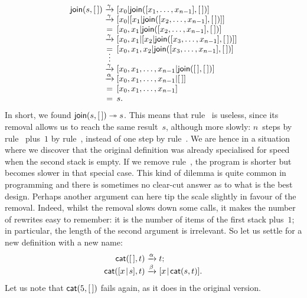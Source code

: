 \begin{equation*}
\begin{array}{r@{\;}c@{\;}l}
\fun{join}(s,\el)
& \smashedrightarrow{\gamma} &
  [x\sb{0}|\fun{join}([x\sb{1},\ldots,x\sb{n-1}],\el)]\\
& \smashedrightarrow{\gamma} &
  [x\sb{0}|[x\sb{1}|\fun{join}([x\sb{2},\ldots,x\sb{n-1}],\el)]]\\
& = & [x\sb{0},x\sb{1}|\fun{join}([x\sb{2},\ldots,x\sb{n-1}],\el)]\\
& \smashedrightarrow{\gamma} &
  [x\sb{0},x\sb{1}|[x\sb{2}|\fun{join}([x\sb{3},\ldots,x\sb{n-1}],\el)]]\\
& = & [x\sb{0},x\sb{1},x\sb{2}|\fun{join}([x\sb{3},\ldots,x\sb{n-1}],\el)]\\
& \smash{\vdots} &\\
& \smashedrightarrow{\gamma} &
  [x\sb{0},x\sb{1},\ldots,x\sb{n-1}|\fun{join}(\el,\el)]\\
& \smashedrightarrow{\alpha} & [x\sb{0},x\sb{1},\ldots,x\sb{n-1}|\el]\\
& = & [x\sb{0},x\sb{1},\ldots,x\sb{n-1}]\\
& = & s.
\end{array}
\end{equation*}
In short, we found \(\textsf{join}(s,[\,]) \twoheadrightarrow s\).
This means that rule~\clause{\beta} is useless, since its removal
allows us to reach the same result~\(s\), although more slowly:
\(n\)~steps by rule~\clause{\gamma} plus~\(1\) by
rule~\clause{\alpha}, instead of one step by
rule~\clause{\beta}. We are hence in a situation where we discover
that the original definition was already specialised for speed when
the second stack is empty. If we remove rule~\clause{\beta}, the
program is shorter but becomes slower in that special case. This kind
of dilemma is quite common in programming and there is sometimes no
clear\hyp{}cut answer as to what is the best design. Perhaps another
argument can here tip the scale slightly in favour of the
removal. Indeed, whilst the removal slows down some calls, it makes
the number of rewrites easy to remember: it is the number of items of
the first stack plus~\(1\); in particular, the length of the second
argument is irrelevant. So let us settle for a new definition with a
new name:
\begin{equation*}
\begin{array}{r@{\;}l@{\;}l}
\fun{cat}(\el,t) & \xrightarrow{\alpha} & t;\\
\fun{cat}(\cons{x}{s},t) & \xrightarrow{\beta} &
\cons{x}{\fun{cat}(s,t)}.
\end{array}
\end{equation*}
Let us note that \(\textsf{cat}(5,[\,])\) fails again, as it does in the
original version.

